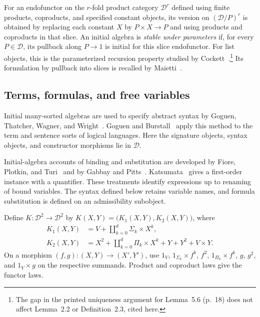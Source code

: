 \documentclass[11pt]{article}
\theoremstyle{definition}\newtheorem{definition}[theorem]{Definition}
\begin{document}
For an endofunctor on the $r$-fold product category $\mathcal D^r$
defined using finite products, coproducts, and specified constant objects, its version on
$(\mathcal D/P)^r$ is obtained
by replacing each constant $X$ by $P\times X\to P$ and using
products and coproducts in that slice. An initial algebra is
\emph{stable under parameters} if, for every $P\in\mathcal D$,
its pullback along $P\to1$ is initial for this slice endofunctor.
For list objects, this is the parameterized recursion property studied by
Cockett~\cite[Lemma 2.2 and Definition 2.3]{CockettLists}.\footnote{The gap
in the printed uniqueness argument for Lemma~5.6 (p.~18) does not affect
Lemma~2.2 or Definition~2.3, cited here.}
Its formulation by pullback into slices is
recalled by Maietti~\cite[Definition 2.4 and the following paragraph]{MaiettiLists}.

\subsection{Terms, formulas, and free variables}
\label{app:first-order-syntax}

Initial many-sorted algebras are used to specify abstract syntax by
Goguen, Thatcher, Wagner, and Wright~\cite[Section 2]{GTWW}.
Goguen and Burstall~\cite[Section 4]{GoguenBurstall} apply this method
to the term and sentence sorts of logical languages.
Here the signature objects, syntax objects, and constructor morphisms
lie in $\mathcal D$.

Initial-algebra accounts of binding and substitution are developed by
Fiore, Plotkin, and Turi~\cite[Sections 2--4]{FPT} and by
Gabbay and Pitts~\cite[Section 6]{GabbayPitts}.
Katsumata~\cite[Section 2, Example 1(3)]{Katsumata} gives a first-order
instance with a quantifier. These treatments identify expressions up to
renaming of bound variables. The syntax defined below retains variable
names, and formula substitution is defined on an admissibility subobject.

Define $K:\mathcal D^2\to\mathcal D^2$ by
$K(X,Y)=\bigl(K_1(X,Y),K_2(X,Y)\bigr)$, where
\begin{align}
 K_1(X,Y)&=V+\coprod_{k=0}^{d}\Sigma_k\times X^k,
                                                        \label{eq:term-functor}\\
 K_2(X,Y)&=X^2+\coprod_{k=0}^{d}\Pi_k\times X^k
                  +Y+Y^2+V\times Y.                    \label{eq:formula-functor}
\end{align}
On a morphism $(f,g):(X,Y)\to(X',Y')$, use
$1_V$, $1_{\Sigma_k}\times f^k$, $f^2$,
$1_{\Pi_k}\times f^k$, $g$, $g^2$, and $1_V\times g$ on
the respective summands. Product and coproduct laws give the
functor laws.
\end{document}
